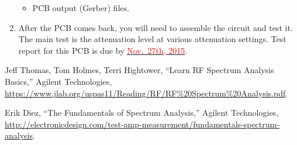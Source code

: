 \documentclass[letterpaper, 11pt]{article}
\newcommand{\due}[1]{\href{https://github.com/ucdart/UCD-EEC134/blob/master/support/schedule/eec134-schedule.pdf}{\textcolor{red}{#1}}}
\begin{document}
\begin{enumerate}
\begin{itemize}
			\item PCB output (Gerber) files.
		\end{itemize}

	\item After the PCB comes back, you will need to assemble the circuit and test it. The main test is the attenuation level at various attenuation settings. Test report for this PCB is due by \due{Nov.~27th, 2015}.

\end{enumerate}

\begin{thebibliography}{9}
 
Jeff Thomas, Tom Holmes, Terri Hightower, ``Learn RF Spectrum Analysis Basics,'' Agilent Technologies, \url{https://www.jlab.org/uspas11/Reading/RF/RF%20Spectrum%20Analysis.pdf}.

Erik Diez, ``The Fundamentals of Spectrum Analysis,'' Agilent Technologies, \url{http://electronicdesign.com/test-amp-measurement/fundamentals-spectrum-analysis}.


\end{thebibliography}
\end{document}
